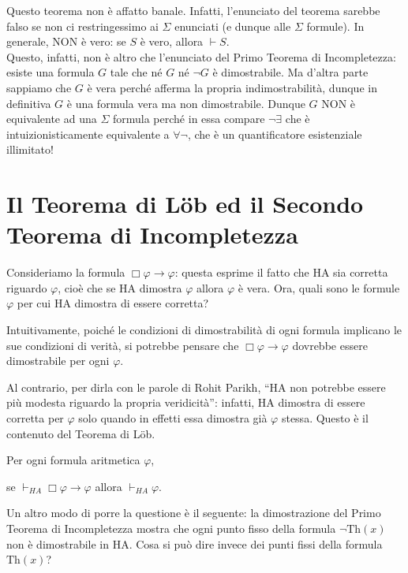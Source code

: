 \begin{oss}
Questo teorema non è affatto banale. Infatti, l'enunciato del teorema sarebbe falso se non ci restringessimo ai $\Sigma$ enunciati (e dunque alle $\Sigma$ formule). In generale, NON è vero: se $S$ è vero, allora $\vdash S$.\\
Questo, infatti, non è altro che l'enunciato del Primo Teorema di Incompletezza: esiste una formula $G$ tale che né $G$ né $\neg G$ è dimostrabile. Ma d'altra parte sappiamo che $G$ è vera perché afferma la propria indimostrabilità, dunque in definitiva $G$ è una formula vera ma non dimostrabile. Dunque $G$ NON è equivalente ad una $\Sigma$ formula perché in essa compare $\neg \exists$ che è intuizionisticamente equivalente a $\forall \neg$, che è un quantificatore esistenziale illimitato!
\end{oss}


\section{Il Teorema di L\"ob ed il Secondo Teorema di Incompletezza}

\noindent Consideriamo la formula $\Box\varphi\to\varphi$: questa esprime il fatto che HA sia corretta riguardo $\varphi$, cioè che se HA dimostra $\varphi$ allora $\varphi$ è vera. Ora, quali sono le formule $\varphi$ per cui HA dimostra di essere corretta?

Intuitivamente, poiché le condizioni di dimostrabilità di ogni formula implicano le sue condizioni di verità, si potrebbe pensare che $\Box\varphi\to\varphi$ dovrebbe essere dimostrabile per ogni $\varphi$.

Al contrario, per dirla con le parole di Rohit Parikh, ``HA non potrebbe essere più modesta riguardo la propria veridicità'': infatti, HA dimostra di essere corretta per $\varphi$ solo quando in effetti essa dimostra già $\varphi$ stessa. Questo è il contenuto del Teorema di L\"ob.

\begin{thm}[Teorema di L\"ob]
Per ogni formula aritmetica $\varphi$,
\begin{center}
se $\vdash_{HA}\Box\varphi\to\varphi$ allora $\vdash_{HA}\varphi$.
\end{center}
\end{thm}

\noindent Un altro modo di porre la questione è il seguente: la dimostrazione del Primo Teorema di Incompletezza mostra che ogni punto fisso della formula $\neg\ensuremath{\mathrm{Th}}(x)$ non è dimostrabile in HA. Cosa si può dire invece dei punti fissi della formula $\ensuremath{\mathrm{Th}}(x)$?

